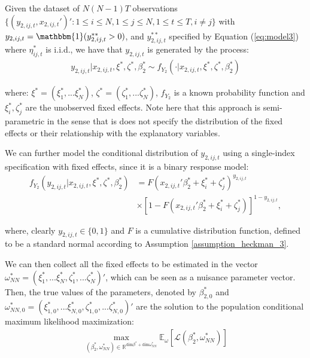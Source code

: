 Given the dataset of $N(N-1)T$ observations $\{ (y_{2,ij,t}, x_{2,ij,t}')' : 1 \leq i \leq N, 1 \leq j \leq N, 1 \leq t \leq T, i \neq j \}$ with $y_{2,ij,t} = \mathbbm{1} (y_{2,ij,t}^{**} > 0)$, and $y_{2,ij,t}^{**}$ specified by Equation (\ref{eq:model3}) where $\eta_{ij,t}^{*}$ is i.i.d., we have that $y_{2,ij,t}$ is generated by the process:
\begin{align*}
    y_{2,ij,t} \rvert x_{2,ij,t}, \xi^*, \zeta^*, \beta_2^* \sim f_{Y_2}(\cdot \rvert x_{2,ij,t}, \xi^*, \zeta^*, \beta_2^*)
\end{align*}

\noindent where: $\xi^* = (\xi_1^*, ... \xi_N^*)$, $\zeta^* = (\zeta_1^*, ... \zeta_N^*)$, $f_{Y_2}$ is a known probability function and $\xi^*_i, \zeta^*_j$ are the unobserved fixed effects.
Note here that this approach is semi-parametric in the sense that is does not specify the distribution of the fixed effects or their relationship with the explanatory variables.

We can further model the conditional distribution of $y_{2,ij,t}$ using a single-index specification with fixed effects, since it is a binary response model: 
\begin{align}
   f_{Y_2} ( y_{2,ij,t} \rvert  x_{2,ij,t}, \xi^*, \zeta^*, \beta_2^*) &= F(x_{2,ij,t}'{\beta_2^*}  +\xi_{i}^*+\zeta_{j}^*)^{y_{2,ij,t}} \nonumber\\ 
   &\times [1 - F(x_{2,ij,t}'{\beta_2^*}  +\xi_{i}^*+\zeta_{j}^*)]^{1-y_{2,ij,t}}, 
   \label{eq:fy}
\end{align}

\noindent where, clearly $y_{2,ij,t}  \in \{0,1\}$ and $F$ is a cumulative distribution function, defined to be a standard normal according to Assumption \ref{assumption_heckman_3}.

We can then collect all the fixed effects to be estimated in the vector $\omega_{NN}^* = {(\xi_1^*, ... \xi_N^*, \zeta_1^*, ... \zeta_N^*)}'$, which can be seen as a nuisance parameter vector. Then, the true values of the parameters, denoted by $\beta_{2,0}^*$ and $\omega_{NN,0}^* = {(\xi_{1,0}^* , ... \xi_{N,0}^* , \zeta_{1,0}^* , ... \zeta_{N,0}^*)}'$ are the solution to the population conditional maximum likelihood maximization:
\begin{align}
    \max_{(\beta_2^*, \omega_{NN}^*) \in \mathbb{R}^{\text{dim} \beta^* + \text{dim} \omega_{NN}^*}} \mathbb{E}_\omega [\mathcal{L} (\beta_2^*, \omega_{NN}^*)]
    \label{eq:val1}
\end{align}

